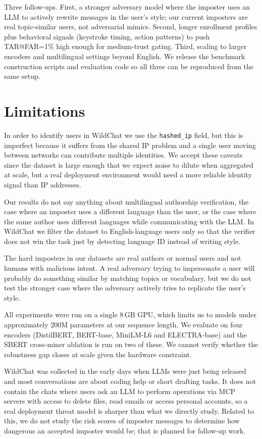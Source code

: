 \documentclass[11pt]{article}
\begin{document}
Three follow-ups. First, a stronger adversary model where the imposter uses an LLM to actively rewrite messages in the user's style; our current imposters are real topic-similar users, not adversarial mimics. Second, longer enrollment profiles plus behavioral signals (keystroke timing, action patterns) to push TAR@FAR=1\% high enough for medium-trust gating. Third, scaling to larger encoders and multilingual settings beyond English. We release the benchmark construction scripts and evaluation code so all three can be reproduced from the same setup.

\section*{Limitations}

In order to identify users in WildChat we use the \texttt{hashed\_ip} field, but this is imperfect because it suffers from the shared IP problem and a single user moving between networks can contribute multiple identities. We accept these caveats since the dataset is large enough that we expect noise to dilute when aggregated at scale, but a real deployment environment would need a more reliable identity signal than IP addresses.

Our results do not say anything about multilingual authorship verification, the case where an imposter uses a different language than the user, or the case where the same author uses different languages while communicating with the LLM. In WildChat we filter the dataset to English-language users only so that the verifier does not win the task just by detecting language ID instead of writing style.

The hard imposters in our datasets are real authors or normal users and not humans with malicious intent. A real adversary trying to impersonate a user will probably do something similar by matching topics or vocabulary, but we do not test the stronger case where the adversary actively tries to replicate the user's style.

All experiments were run on a single 8\,GB GPU, which limits us to models under approximately 200M parameters at our sequence length. We evaluate on four encoders (DistilBERT, BERT-base, MiniLM-L6 and ELECTRA-base) and the SBERT cross-miner ablation is run on two of these. We cannot verify whether the robustness gap closes at scale given the hardware constraint.

WildChat was collected in the early days when LLMs were just being released and most conversations are about coding help or short drafting tasks. It does not contain the chats where users ask an LLM to perform operations via MCP servers with access to delete files, read emails or access personal accounts, so a real deployment threat model is sharper than what we directly study. Related to this, we do not study the risk scores of imposter messages to determine how dangerous an accepted imposter would be; that is planned for follow-up work.
\end{document}
